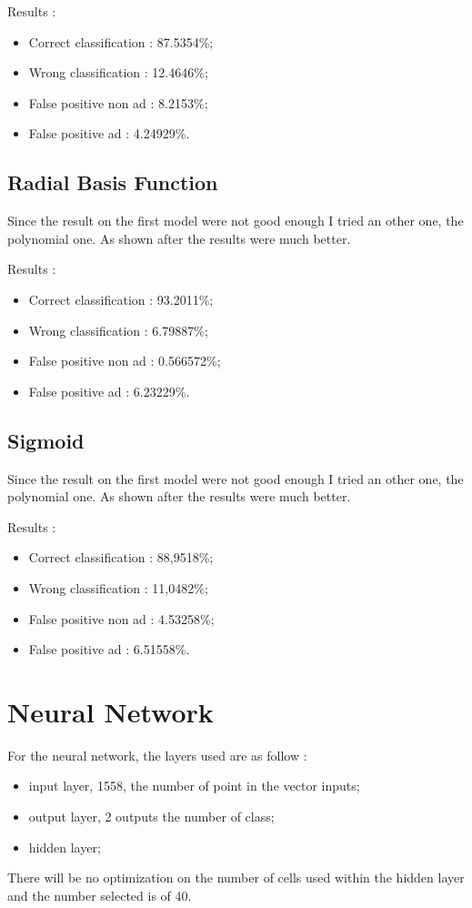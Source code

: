 Results :
\begin{itemize}
  \item Correct classification : 87.5354\%;
  \item Wrong classification : 12.4646\%;
  \item False positive non ad : 8.2153\%;
  \item False positive ad : 4.24929\%.
\end{itemize}

\subsection{Radial Basis Function}

Since the result on the first model were not good enough I tried an other one, the polynomial one. As shown after the results were much better.

Results :
\begin{itemize}
  \item Correct classification : 93.2011\%;
  \item Wrong classification : 6.79887\%;
  \item False positive non ad : 0.566572\%;
  \item False positive ad : 6.23229\%.
\end{itemize}

\subsection{Sigmoid}

Since the result on the first model were not good enough I tried an other one, the polynomial one. As shown after the results were much better.

Results :
\begin{itemize}
  \item Correct classification : 88,9518\%;
  \item Wrong classification : 11,0482\%;
  \item False positive non ad : 4.53258\%;
  \item False positive ad : 6.51558\%.
\end{itemize}

\section{Neural Network}
For the neural network, the layers used are as follow :
  \begin{itemize}
    \item input layer, 1558, the number of point in the vector inputs;
    \item output layer, 2 outputs the number of class;
    \item hidden layer;
  \end{itemize}
  There will be no optimization on the number of cells used within the hidden layer and the number selected is of 40.

